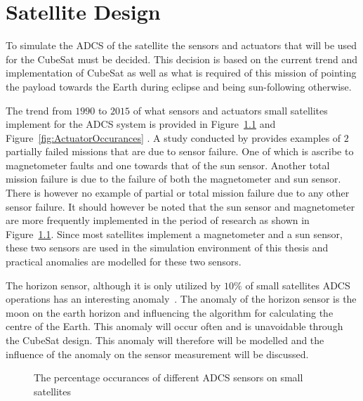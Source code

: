\chapter{Satellite Design}
\label{chap:SatDesign}
To simulate the ADCS of the satellite the sensors and actuators that will be used for the CubeSat must be decided. This decision is based on the current trend and implementation of CubeSat as well as what is required of this mission of pointing the payload towards the Earth during eclipse and being sun-following otherwise.

The trend from $1990$ to $2015$ of what sensors and actuators small satellites implement for the ADCS system is provided in Figure~\ref{fig:SensorOccurances} and Figure~\ref{fig:ActuatorOccurances} \cite{JansevanVuuren2015}. A study conducted by \cite{Jacklin2019} provides examples of $2$ partially failed missions that are due to sensor failure. One of which is ascribe to magnetometer faults and one towards that of the sun sensor. Another total mission failure is due to the failure of both the magnetometer and sun sensor. There is however no example of partial or total mission failure due to any other sensor failure. It should however be noted that the sun sensor and magnetometer are more frequently implemented in the period of \cite{Jacklin2019} research as shown in Figure~\ref{fig:SensorOccurances}. Since most satellites implement a magnetometer and a sun sensor, these two sensors are used in the simulation environment of this thesis and practical anomalies are modelled for these two sensors.

The horizon sensor, although it is only utilized by $10\%$ of small satellites ADCS operations has an interesting anomaly~\cite{wessels2018infrared}. The anomaly of the horizon sensor is the moon on the earth horizon and influencing the algorithm for calculating the centre of the Earth. This anomaly will occur often and is unavoidable through the CubeSat design. This anomaly will therefore will be modelled and the influence of the anomaly on the sensor measurement will be discussed.

\begin{figure}
\centering
\caption{The percentage occurances of different ADCS sensors on small satellites}
\label{fig:SensorOccurances}
\end{figure}

